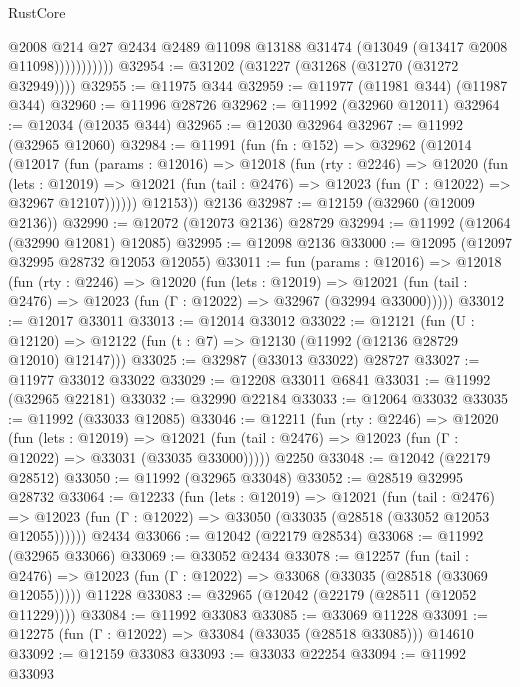\begin{lexlean}{RustCore}
\begin{coremodule}
                      @2008
                      @214
                      @27
                      @2434
                      @2489
                      @11098
                      @13188
                      @31474
                      (@13049 (@13417 @2008 @11098)))))))))))
@32954 := @31202 (@31227 (@31268 (@31270 (@31272 @32949))))
@32955 := @11975 @344
@32959 := @11977 (@11981 @344) (@11987 @344)
@32960 := @11996 @28726
@32962 := @11992 (@32960 @12011)
@32964 := @12034 (@12035 @344)
@32965 := @12030 @32964
@32967 := @11992 (@32965 @12060)
@32984 := @11991
    (fun (fn : @152) =>
    @32962
      (@12014
        (@12017
          (fun (params : @12016) =>
          @12018
            (fun (rty : @2246) =>
            @12020
              (fun (lets : @12019) =>
              @12021 (fun (tail : @2476) => @12023 (fun (Γ : @12022) => @32967 @12107))))))
        @12153))
    @2136
@32987 := @12159 (@32960 (@12009 @2136))
@32990 := @12072 (@12073 @2136) @28729
@32994 := @11992 (@12064 (@32990 @12081) @12085)
@32995 := @12098 @2136
@33000 := @12095 (@12097 @32995 @28732 @12053 @12055)
@33011 := fun (params : @12016) =>
  @12018
    (fun (rty : @2246) =>
    @12020
      (fun (lets : @12019) =>
      @12021 (fun (tail : @2476) => @12023 (fun (Γ : @12022) => @32967 (@32994 @33000)))))
@33012 := @12017 @33011
@33013 := @12014 @33012
@33022 := @12121
    (fun (U : @12120) => @12122 (fun (t : @7) => @12130 (@11992 (@12136 @28729 @12010) @12147)))
@33025 := @32987 (@33013 @33022) @28727
@33027 := @11977 @33012 @33022
@33029 := @12208 @33011 @6841
@33031 := @11992 (@32965 @22181)
@33032 := @32990 @22184
@33033 := @12064 @33032
@33035 := @11992 (@33033 @12085)
@33046 := @12211
    (fun (rty : @2246) =>
    @12020
      (fun (lets : @12019) =>
      @12021 (fun (tail : @2476) => @12023 (fun (Γ : @12022) => @33031 (@33035 @33000)))))
    @2250
@33048 := @12042 (@22179 @28512)
@33050 := @11992 (@32965 @33048)
@33052 := @28519 @32995 @28732
@33064 := @12233
    (fun (lets : @12019) =>
    @12021
      (fun (tail : @2476) =>
      @12023 (fun (Γ : @12022) => @33050 (@33035 (@28518 (@33052 @12053 @12055))))))
    @2434
@33066 := @12042 (@22179 @28534)
@33068 := @11992 (@32965 @33066)
@33069 := @33052 @2434
@33078 := @12257
    (fun (tail : @2476) => @12023 (fun (Γ : @12022) => @33068 (@33035 (@28518 (@33069 @12055)))))
    @11228
@33083 := @32965 (@12042 (@22179 (@28511 (@12052 @11229))))
@33084 := @11992 @33083
@33085 := @33069 @11228
@33091 := @12275 (fun (Γ : @12022) => @33084 (@33035 (@28518 @33085))) @14610
@33092 := @12159 @33083
@33093 := @33033 @22254
@33094 := @11992 @33093

\end{coremodule}
\end{lexlean}

